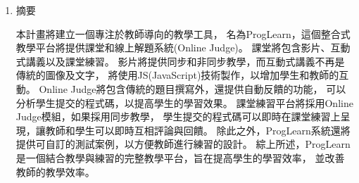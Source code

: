 \documentclass[12pt]{article}
\begin{document}
\date{}
\usetikzlibrary{automata, positioning, arrows}
{}

\begin{enumerate}
  \setlength{\parindent}{2em}
  \item 摘要 
    \par 本計畫將建立一個專注於教師導向的教學工具，
    名為ProgLearn，這個整合式教學平台將提供課堂和線上解題系統(Online Judge)\cite{ref1}。
    課堂將包含影片、互動式講義以及課堂練習。
    影片將提供同步和非同步教學，而互動式講義不再是傳統的圖像及文字，
    將使用JS(JavaScript)技術製作，以增加學生和教師的互動。
    Online Judge將包含傳統的題目撰寫外，還提供自動反饋的功能，
    可以分析學生提交的程式碼，以提高學生的學習效果。
    課堂練習平台將採用Online Judge模組，如果採用同步教學，
    學生提交的程式碼可以即時在課堂練習上呈現，讓教師和學生可以即時互相評論與回饋。
    除此之外，ProgLearn系統還將提供可自訂的測試案例，以方便教師進行練習的設計。
    綜上所述，ProgLearn是一個結合教學與練習的完整教學平台，旨在提高學生的學習效率，
    並改善教師的教學效率。


\end{enumerate}
\end{document}

